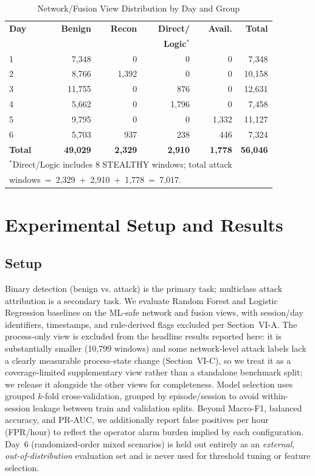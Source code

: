 \documentclass[conference]{IEEEtran}
\begin{document}
\begin{table}[t]
\centering
\caption{Network/Fusion View Distribution by Day and Group}
\label{tab:distribution}
\begin{tabular}{lrrrrr}
\toprule
\textbf{Day} & \textbf{Benign} & \textbf{Recon} & \textbf{Direct/} & \textbf{Avail.} & \textbf{Total} \\
 & & & \textbf{Logic}$^*$ & & \\
\midrule
1 & 7{,}348 & 0 & 0 & 0 & 7{,}348 \\
2 & 8{,}766 & 1{,}392 & 0 & 0 & 10{,}158 \\
3 & 11{,}755 & 0 & 876 & 0 & 12{,}631 \\
4 & 5{,}662 & 0 & 1{,}796 & 0 & 7{,}458 \\
5 & 9{,}795 & 0 & 0 & 1{,}332 & 11{,}127 \\
6 & 5{,}703 & 937 & 238 & 446 & 7{,}324 \\
\midrule
\textbf{Total} & \textbf{49{,}029} & \textbf{2{,}329} & \textbf{2{,}910} & \textbf{1{,}778} & \textbf{56{,}046} \\
\bottomrule
\multicolumn{5}{l}{\footnotesize $^*$Direct/Logic includes 8 STEALTHY windows; total attack} \\
\multicolumn{5}{l}{\footnotesize windows~=~2{,}329~+~2{,}910~+~1{,}778~=~7{,}017.}
\end{tabular}
\end{table}

\section{Experimental Setup and Results}

\subsection{Setup}
Binary detection (benign vs. attack) is the primary task; multiclass attack attribution is a secondary task. We evaluate Random Forest and Logistic Regression baselines on the ML-safe network and fusion views, with session/day identifiers, timestamps, and rule-derived flags excluded per Section~VI-A. The process-only view is excluded from the headline results reported here: it is substantially smaller (10{,}799 windows) and some network-level attack labels lack a clearly measurable process-state change (Section~VI-C), so we treat it as a coverage-limited supplementary view rather than a standalone benchmark split; we release it alongside the other views for completeness. Model selection uses grouped $k$-fold cross-validation, grouped by episode/session to avoid within-session leakage between train and validation splits. Beyond Macro-F1, balanced accuracy, and PR-AUC, we additionally report false positives per hour (FPR/hour) to reflect the operator alarm burden implied by each configuration. Day~6 (randomized-order mixed scenarios) is held out entirely as an \emph{external, out-of-distribution} evaluation set and is never used for threshold tuning or feature selection.
\end{document}
